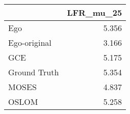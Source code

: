 \begin{tabular}{lr}
\toprule
{} & LFR_mu_25 \\
\midrule
Ego          &     5.356 \\
Ego-original &     3.166 \\
GCE          &     5.175 \\
Ground Truth &     5.354 \\
MOSES        &     4.837 \\
OSLOM        &     5.258 \\
\bottomrule
\end{tabular}
